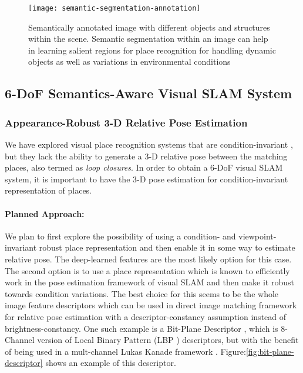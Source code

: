 \documentclass{article}
\begin{document}
\begin{figure}[htbp]
 \centering
 \texttt{[image: semantic-segmentation-annotation]}
 \caption{Semantically annotated image \cite{mottaghi2014role} with different objects and structures within the scene. Semantic segmentation within an image can help in learning salient regions for place recognition for handling dynamic objects as well as variations in environmental conditions}
 \label{fig:semantic-within-example}
\end{figure}

\subsection{6-DoF Semantics-Aware Visual SLAM System}

\subsubsection{Appearance-Robust 3-D Relative Pose Estimation}
We have explored visual place recognition systems that are condition-invariant \cite{Milford2012,Niko2015,chen2017deep}, but they lack the ability to generate a 3-D relative pose between the matching places, also termed as \emph{loop closures}. In order to obtain a 6-DoF visual SLAM system, it is important to have the 3-D pose estimation for condition-invariant representation of places.

\paragraph{Planned Approach:}
We plan to first explore the possibility of using a condition- and viewpoint-invariant robust place representation and then enable it in some way to estimate relative pose. The deep-learned features are the most likely option for this case. The second option is to use a place representation which is known to efficiently work in the pose estimation framework of visual SLAM and then make it robust towards condition variations. The best choice for this seems to be the whole image feature descriptors which can be used in direct image matching framework for relative pose estimation with a descriptor-constancy assumption instead of brightness-constancy. One such example is a Bit-Plane Descriptor \cite{alismail2016bit}, which is 8-Channel version of Local Binary Pattern (LBP \cite{ojala1996comparative}) descriptors, but with the benefit of being used in a mult-channel Lukas Kanade framework \cite{alismail2016bit}. Figure:\ref{fig:bit-plane-descriptor} shows an example of this descriptor.
\end{document}
